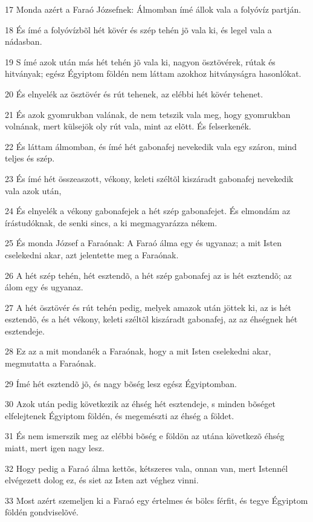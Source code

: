 \par 17 Monda azért a Faraó Józsefnek: Álmomban ímé állok vala a folyóvíz partján.
\par 18 És ímé a folyóvízbõl hét kövér és szép tehén jõ vala ki, és legel vala a nádasban.
\par 19 S ímé azok után más hét tehén jõ vala ki, nagyon ösztövérek, rútak és hitványak; egész Égyiptom földén nem láttam azokhoz hitványságra hasonlókat.
\par 20 És elnyelék az ösztövér és rút tehenek, az elébbi hét kövér tehenet.
\par 21 És azok gyomrukban valának, de nem tetszik vala meg, hogy gyomrukban volnának, mert külsejök oly rút vala, mint az elõtt. És felserkenék.
\par 22 És láttam álmomban, és ímé hét gabonafej nevekedik vala egy száron, mind teljes és szép.
\par 23 És ímé hét összeaszott, vékony, keleti széltõl kiszáradt gabonafej nevekedik vala azok után,
\par 24 És elnyelék a vékony gabonafejek a hét szép gabonafejet. És elmondám az írástudóknak, de senki sincs, a ki megmagyarázza nékem.
\par 25 És monda József a Faraónak: A Faraó álma egy és ugyanaz; a mit Isten cselekedni akar, azt jelentette meg a Faraónak.
\par 26 A hét szép tehén, hét esztendõ, a hét szép gabonafej az is hét esztendõ; az álom egy és ugyanaz.
\par 27 A hét ösztövér és rút tehén pedig, melyek amazok után jöttek ki, az is hét esztendõ, és a hét vékony, keleti széltõl kiszáradt gabonafej, az az éhségnek hét esztendeje.
\par 28 Ez az a mit mondanék a Faraónak, hogy a mit Isten cselekedni akar, megmutatta a Faraónak.
\par 29 Ímé hét esztendõ jõ, és nagy bõség lesz egész Égyiptomban.
\par 30 Azok után pedig következik az éhség hét esztendeje, s minden bõséget elfelejtenek Égyiptom földén, és megemészti az éhség a földet.
\par 31 És nem ismerszik meg az elébbi bõség e földön az utána következõ éhség miatt, mert igen nagy lesz.
\par 32 Hogy pedig a Faraó álma kettõs, kétszeres vala, onnan van, mert Istennél elvégezett dolog ez, és siet az Isten azt véghez vinni.
\par 33 Most azért szemeljen ki a Faraó egy értelmes és bölcs férfit, és tegye Égyiptom földén gondviselõvé.
